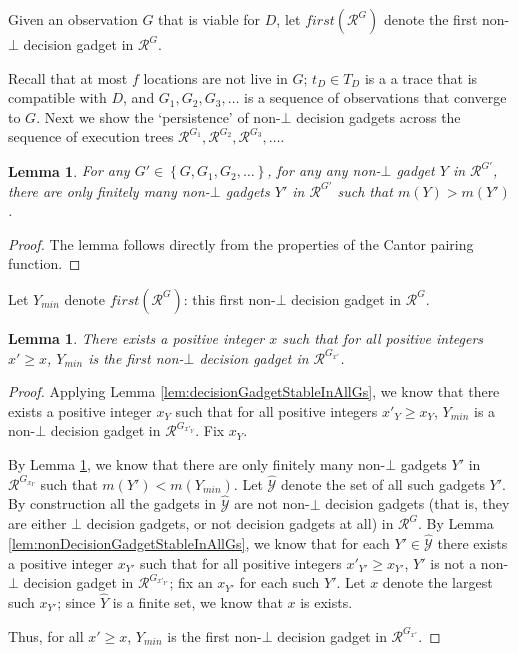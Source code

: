 \documentclass[11pt]{article}
\numberwithin{theorem}{section}
\newtheorem{lemma}[theorem]{Lemma}
\newcommand{\set}[1]{\left\{#1\right\}}
\begin{document}
Given an observation $G$ that is viable for $D$, let
$first(\mathcal{R}^G)$ denote the first non-$\bot$ decision gadget in $\mathcal{R}^G$.

Recall that at most $f$ locations are not
live in $G$; $t_D \in T_D$ is a a trace that is compatible with $D$, and $G_1, G_2, G_3, \ldots$ is a sequence of observations that converge to $G$. Next we show the `persistence' of non-$\bot$ decision gadgets across the sequence of execution trees $\mathcal{R}^{G_1}, \mathcal{R}^{G_2}, \mathcal{R}^{G_3}, \ldots$.

\begin{lemma}
\label{lem:finitelyManySmallerGadgetsInPrefix}
For any $G' \in \set{G, G_1,G_2,\ldots}$, for any any non-$\bot$ gadget $Y$ in $\mathcal{R}^{G'}$, there are only finitely many non-$\bot$ gadgets $Y'$ in $\mathcal{R}^{G'}$ such that $m(Y) > m(Y')$.
\end{lemma}
\begin{proof}
The lemma follows directly from the properties of the Cantor pairing function.
\end{proof}


Let $Y_{min}$ denote $first(\mathcal{R}^G)$: this first non-$\bot$ decision gadget in $\mathcal{R}^G$.


\begin{lemma}\label{lem:minGadgetFoundInAllGs}
There exists a positive integer $x$ such that for all positive integers $x' \geq x$, $Y_{min}$ is the first non-$\bot$ decision gadget in $\mathcal{R}^{G_{x'}}$.
\end{lemma}
\begin{proof}
Applying Lemma \ref{lem:decisionGadgetStableInAllGs}, we know that there exists a positive integer $x_{Y}$ such that for all positive integers $x'_{Y} \geq x_{Y}$, $Y_{min}$ is a non-$\bot$ decision gadget in $\mathcal{R}^{G_{x'_Y}}$. Fix $x_Y$.

By Lemma \ref{lem:finitelyManySmallerGadgetsInPrefix}, we know that there are only finitely many non-$\bot$ gadgets $Y'$ in $\mathcal{R}^{G_{x_Y}}$ such that $m(Y') < m(Y_{min})$.
Let $\hat{\mathcal{Y}}$ denote the set of all such gadgets $Y'$.
By construction all the gadgets in $\hat{\mathcal{Y}}$ are not non-$\bot$ decision gadgets (that is, they are either $\bot$ decision gadgets, or not decision gadgets at all) in $\mathcal{R}^{G}$. 
By Lemma \ref{lem:nonDecisionGadgetStableInAllGs}, we know that for each $Y' \in \hat{\mathcal{Y}}$  there exists a positive integer $x_{Y'}$ such that for all positive integers $x'_{Y'} \geq x_{Y'}$, $Y'$ is not a non-$\bot$ decision gadget in $\mathcal{R}^{G_{x'_{Y'}}}$; fix an $x_{Y'}$ for each such $Y'$. Let $x$ denote the largest such $x_{Y'}$; since $\hat{Y}$ is a finite set, we know that $x$ is exists.

Thus, for all $x' \geq x$, $Y_{min}$ is the first non-$\bot$ decision gadget in $\mathcal{R}^{G_{x'}}$.
\end{proof}
\end{document}
